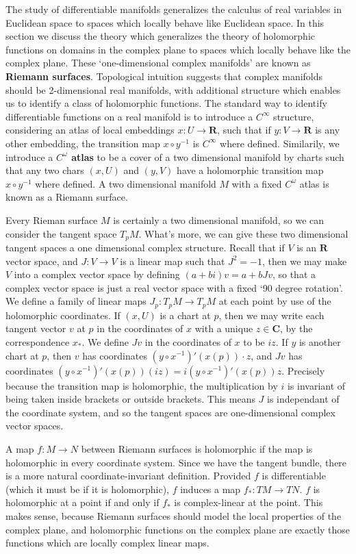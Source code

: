 The study of differentiable manifolds generalizes the calculus of real variables in Euclidean space to spaces which locally behave like Euclidean space. In this section we discuss the theory which generalizes the theory of holomorphic functions on domains in the complex plane to spaces which locally behave like the complex plane. These `one-dimensional complex manifolds' are known as {\bf Riemann surfaces}. Topological intuition suggests that complex manifolds should be 2-dimensional real manifolds, with additional structure which enables us to identify a class of holomorphic functions. The standard way to identify differentiable functions on a real manifold is to introduce a $C^\infty$ structure, considering an atlas of local embeddings $x: U \to \mathbf{R}$, such that if $y: V \to \mathbf{R}$ is any other embedding, the transition map $x \circ y^{-1}$ is $C^\infty$ where defined. Similarily, we introduce a {\bf $C^\omega$ atlas} to be a cover of a two dimensional manifold by charts such that any two chars $(x,U)$ and $(y,V)$ have a holomorphic transition map $x \circ y^{-1}$ where defined. A two dimensional manifold $M$ with a fixed $C^\omega$ atlas is known as a Riemann surface.

Every Rieman surface $M$ is certainly a two dimensional manifold, so we can consider the tangent space $T_p M$. What's more, we can give these two dimensional tangent spaces a one dimensional complex structure. Recall that if $V$ is an $\mathbf{R}$ vector space, and $J: V \to V$ is a linear map such that $J^2 = -1$, then we may make $V$ into a complex vector space by defining $(a + bi)v = a + bJv$, so that a complex vector space is just a real vector space with a fixed `90 degree rotation'. We define a family of linear maps $J_p: T_p M \to T_p M$ at each point by use of the holomorphic coordinates. If $(x,U)$ is a chart at $p$, then we may write each tangent vector $v$ at $p$ in the coordinates of $x$ with a unique $z \in \mathbf{C}$, by the correspondence $x_*$. We define $Jv$ in the coordinates of $x$ to be $iz$. If $y$ is another chart at $p$, then $v$ has coordinates $(y \circ x^{-1})'(x(p)) \cdot z$, and $Jv$ has coordinates $(y \circ x^{-1})'(x(p))(iz) = i(y \circ x^{-1})'(x(p)) z$. Precisely because the transition map is holomorphic, the multiplication by $i$ is invariant of being taken inside brackets or outside brackets. This means $J$ is independant of the coordinate system, and so the tangent spaces are one-dimensional complex vector spaces.

A map $f: M \to N$ between Riemann surfaces is holomorphic if the map is holomorphic in every coordinate system. Since we have the tangent bundle, there is a more natural coordinate-invariant definition. Provided $f$ is differentiable (which it must be if it is holomorphic), $f$ induces a map $f_*: TM \to TN$. $f$ is holomorphic at a point if and only if $f_*$ is complex-linear at the point. This makes sense, because Riemann surfaces should model the local properties of the complex plane, and holomorphic functions on the complex plane are exactly those functions which are locally complex linear maps.

